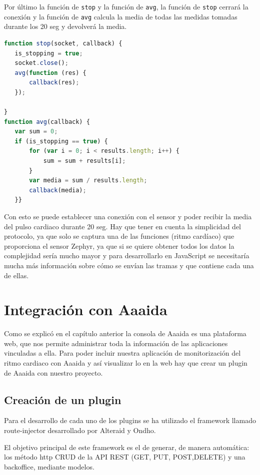 Por último la función de \texttt{stop} y la función de \texttt{avg}, la función de \texttt{stop} cerrará la conexión y la función de \texttt{avg} calcula la media de todas las medidas tomadas durante los 20 seg y devolverá la media. 

\begin{lstlisting}[language=JavaScript]
function stop(socket, callback) {
   is_stopping = true;
   socket.close();
   avg(function (res) {
       callback(res);
   });

}
function avg(callback) {
   var sum = 0;
   if (is_stopping == true) {
       for (var i = 0; i < results.length; i++) {
           sum = sum + results[i];
       }
       var media = sum / results.length;
       callback(media);
   }}
\end{lstlisting}

Con esto se puede establecer una conexión con el sensor y poder recibir la media del pulso cardiaco durante 20 seg. Hay que tener en cuenta la simplicidad del protocolo, ya que solo se captura una de las funciones (ritmo cardíaco) que proporciona el sensor Zephyr, ya que si se quiere obtener todos los datos la complejidad sería mucho mayor y para desarrollarlo en JavaScript se necesitaría mucha más información sobre cómo se envían las tramas y que contiene cada una de ellas.

\section{Integración con Aaaida}

Como se explicó en el capítulo anterior la consola de Aaaida es una plataforma web, que nos permite administrar toda la información de las aplicaciones vinculadas a ella. 
Para poder incluir nuestra aplicación de monitorización del ritmo cardiaco con Aaaida y así visualizar lo en la web hay que crear un plugin de Aaaida con nuestro proyecto. 

\subsection{Creación de un plugin}

Para el desarrollo de cada uno de los plugins se ha utilizado el framework llamado route-injector desarrollado por Alteraid y Ondho. 

El objetivo principal de este framework es el de generar, de manera automática:
los método http CRUD de la API REST (GET, PUT, POST,DELETE) y una
backoffice, mediante modelos.


